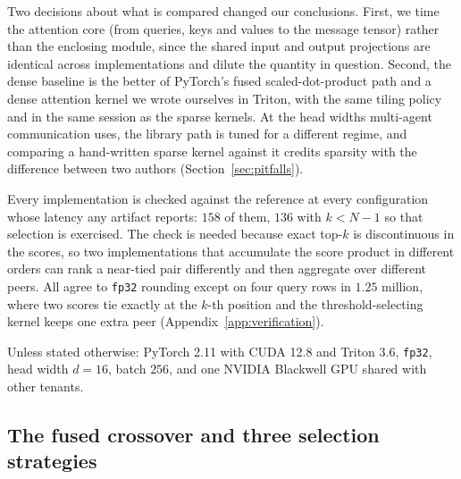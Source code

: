 Two decisions about what is compared changed our conclusions. First, we time
the attention core (from queries, keys and values to the message tensor) rather
than the enclosing module, since the shared
input and output projections are identical across implementations and dilute the
quantity in question. Second, the dense baseline is the better of PyTorch's
fused scaled-dot-product path and a dense attention kernel we wrote ourselves in
Triton, with the same tiling policy and in the same session as the sparse
kernels. At the head widths multi-agent communication uses, the library path is
tuned for a different regime, and comparing a hand-written sparse kernel against
it credits sparsity with the difference between two authors
(Section~\ref{sec:pitfalls}).

Every implementation is checked against the reference at every configuration
whose latency any artifact reports: $158$ of them, $136$ with $k < N-1$ so
that selection is exercised. The check is needed because exact top-$k$ is
discontinuous in the scores, so two implementations that accumulate the score
product in different orders can rank a near-tied pair differently and then
aggregate over different peers. All agree to \texttt{fp32} rounding except on
four query rows in $1.25$ million, where two scores tie exactly at the $k$-th
position and the threshold-selecting kernel keeps one extra peer
(Appendix~\ref{app:verification}).

Unless stated otherwise: PyTorch 2.11 with CUDA 12.8 and Triton 3.6,
\texttt{fp32}, head width $d{=}16$, batch $256$, and one NVIDIA Blackwell GPU
shared with other tenants.


\subsection{The fused crossover and three selection strategies}
\label{app:selection}

\begin{table}[t]
\centering\small
\caption{The sparsity at which the best sparse implementation stops being faster than the best dense one, and how far it is from parity at about a quarter of the peers. Both ratio columns are a minimum over the composed path and the two fused kernels that rank in registers, so the widest-$k$ column is sometimes the composed path; the sorted kernel of Table~\ref{tab:selection} is faster than all three from sixteen retained peers upward and is reported there. Restricted to the agent counts at which per-kernel cost does not dominate. The replayed column is the fused kernel at one retained peer under CUDA-graph replay, pooled over three further sessions of three interleaved blocks each, as ratio of minima and ratio of medians.}
\label{tab:crossover}

\end{table}

